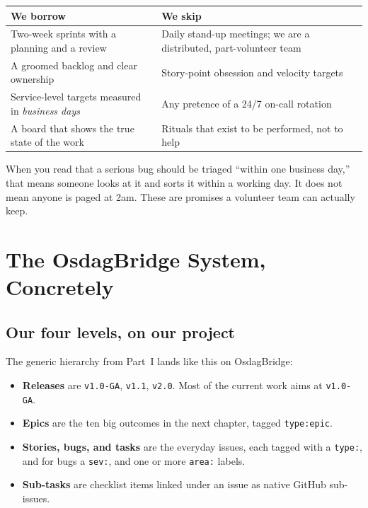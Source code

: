 \documentclass[11pt,a4paper]{report}
\newcommand{\code}[1]{\texttt{#1}}
\begin{document}
\begin{center}
\begin{tabular}{@{}p{6.2cm}p{7.2cm}@{}}
\toprule
\textbf{We borrow} & \textbf{We skip} \\
\midrule
Two-week sprints with a planning and a review & Daily stand-up meetings; we are a distributed, part-volunteer team \\
A groomed backlog and clear ownership & Story-point obsession and velocity targets \\
Service-level targets measured in \emph{business days} & Any pretence of a 24/7 on-call rotation \\
A board that shows the true state of the work & Rituals that exist to be performed, not to help \\
\bottomrule
\end{tabular}
\end{center}

\begin{notebox}
When you read that a serious bug should be triaged ``within one business day,''
that means someone looks at it and sorts it within a working day. It does not mean
anyone is paged at 2am. These are promises a volunteer team can actually keep.
\end{notebox}

\part{The OsdagBridge System, Concretely}

\chapter{Our four levels, on our project}

The generic hierarchy from Part~I lands like this on OsdagBridge:

\begin{itemize}[leftmargin=1.4em,itemsep=3pt]
  \item \textbf{Releases} are \code{v1.0-GA}, \code{v1.1}, \code{v2.0}. Most of the
        current work aims at \code{v1.0-GA}.
  \item \textbf{Epics} are the ten big outcomes in the next chapter, tagged
        \code{type:epic}.
  \item \textbf{Stories, bugs, and tasks} are the everyday issues, each tagged with
        a \code{type:}, and for bugs a \code{sev:}, and one or more \code{area:}
        labels.
  \item \textbf{Sub-tasks} are checklist items linked under an issue as native
        GitHub sub-issues.
\end{itemize}
\end{document}
